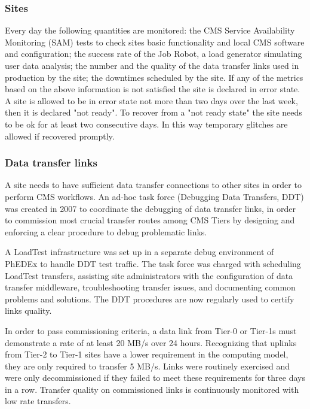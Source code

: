 \subsubsection{ Sites }
\label{sec:4_2_1} 
Every day the following quantities are monitored:
the CMS Service Availability Monitoring (SAM) tests to check sites basic 
functionality and local CMS software and configuration;
the success rate of the Job Robot, a load generator simulating
user data analysis; the number and the quality of the data
transfer links used in production by the site;
the downtimes scheduled by the site.
If any of the metrics based on the above information is not satisfied the site is declared in error state. A site is allowed to be in error state
not more than two days over the last week, then it is declared "not ready".
To recover from a "not ready state" the site needs to be ok for at least two consecutive days. In this way temporary glitches are allowed if recovered promptly.

\subsubsection{ Data transfer links }
\label{sec:LinkCommissioning}
A site needs to have sufficient data transfer connections to other sites in
order to perform CMS workflows. 
An ad-hoc task force (Debugging Data Transfers, DDT)\cite{RefDDT}
was created in 2007 to coordinate the debugging of data transfer links,
in order to commission most crucial transfer routes among CMS Tiers 
by designing and enforcing a clear procedure to debug problematic links.

A LoadTest infrastructure was set up in a separate debug environment of PhEDEx
to handle DDT test traffic.
The task force was charged with scheduling LoadTest transfers, assisting site
administrators with the configuration of data transfer middleware,
troubleshooting transfer issues, and documenting common problems and solutions.
The DDT procedures are now regularly used to certify links quality.

In order to pass commissioning criteria, a data link from Tier-0 or Tier-1s must
demonstrate a rate of at least 20 MB/s over 24 hours. Recognizing that uplinks
from Tier-2 to Tier-1 sites have a lower requirement in the computing model,
they are only required to transfer 5 MB/s. Links were routinely exercised and
were only decommissioned if they failed to meet these requirements for three
days in a row. Transfer quality on commissioned links is continuously monitored
with low rate transfers.

